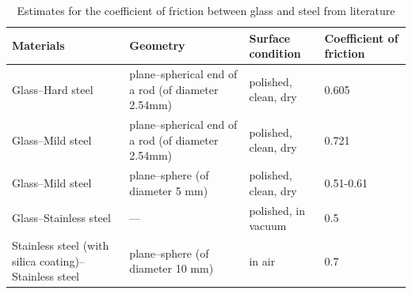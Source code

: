 \documentclass[preprint,10pt,times]{elsarticle}
\numberwithin{equation}{section}
\begin{document}
\begin{table}[ht!]
\centering
\begin{tabular}{p{} p{} p{} p{}}
\toprule
Materials                                        & Geometry      & Surface condition    & Coefficient of friction\\
\midrule
Glass--Hard steel~\cite{Tomlinson1929friction}   & plane--spherical end of a rod (of diameter 2.54mm) & polished, clean, dry & 0.605\\
\addlinespace[0.5em]
Glass--Mild steel~\cite{Tomlinson1929friction}    & plane--spherical end of a rod (of diameter 2.54mm) & polished, clean, dry & 0.721\\
\addlinespace[0.5em]
Glass--Mild steel~\cite{beare1935physical}        & plane--sphere (of diameter 5 mm)  & polished, clean, dry & 0.51-0.61\\
\addlinespace[0.5em]
Glass--Stainless steel~\cite{deulin2010mechanics} & ---          & polished, in vacuum  & 0.5\\
\addlinespace[0.5em]
Stainless steel (with silica coating)--Stainless steel~\cite{marsal2013mechanical} & plane--sphere (of diameter 10 mm) & in air & 0.7\\
\bottomrule
\end{tabular}
\caption{Estimates for the coefficient of friction between glass and steel from literature}
\label{tab:mu0}
\end{table}

\pagebreak{}
\end{document}
